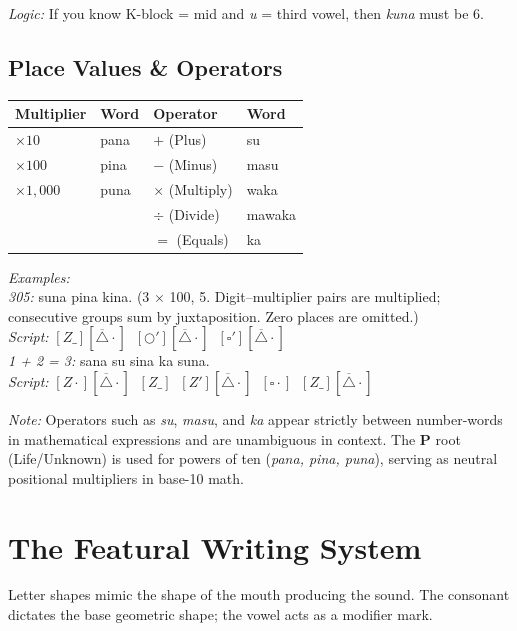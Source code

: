 \documentclass[12pt, a4paper]{article}
\begin{document}
\vspace{0.5em}
\textit{Logic:} If you know K-block = mid and \textit{u} = third vowel, then \textit{kuna} must be 6.

\subsection{Place Values \& Operators}

\vspace{0.5em}
\begin{tabular}{@{}ll|ll@{}}
\toprule
\textbf{Multiplier} & \textbf{Word} & \textbf{Operator} & \textbf{Word} \\ \midrule
$\times 10$ & pana & $+$ (Plus) & su \\
$\times 100$ & pina & $-$ (Minus) & masu \\
$\times 1{,}000$ & puna & $\times$ (Multiply) & waka \\
& & $\div$ (Divide) & mawaka \\
& & $=$ (Equals) & ka \\ \bottomrule
\end{tabular}

\vspace{0.5em}
\noindent\textit{Examples:} \\
\textit{305:} suna pina kina. \quad (3 $\times$ 100, 5. Digit--multiplier pairs are multiplied; consecutive groups sum by juxtaposition. Zero places are omitted.) \\
\textit{Script:} $[Z\_][\overline{\triangle}\cdot] \;\; [\bigcirc'][\overline{\triangle}\cdot] \;\; [\square'][\overline{\triangle}\cdot]$ \\[0.3em]
\textit{1 + 2 = 3:} sana su sina ka suna. \\
\textit{Script:} $[Z\cdot][\overline{\triangle}\cdot] \;\; [Z\_] \;\; [Z'][\overline{\triangle}\cdot] \;\; [\square\cdot] \;\; [Z\_][\overline{\triangle}\cdot]$

\vspace{0.5em}
\textit{Note:} Operators such as \textit{su}, \textit{masu}, and \textit{ka} appear strictly between number-words in mathematical expressions and are unambiguous in context. The \textbf{P} root (Life/Unknown) is used for powers of ten (\textit{pana, pina, puna}), serving as neutral positional multipliers in base-10 math.

\section{The Featural Writing System}
Letter shapes mimic the shape of the mouth producing the sound. The consonant dictates the base geometric shape; the vowel acts as a modifier mark.
\end{document}
